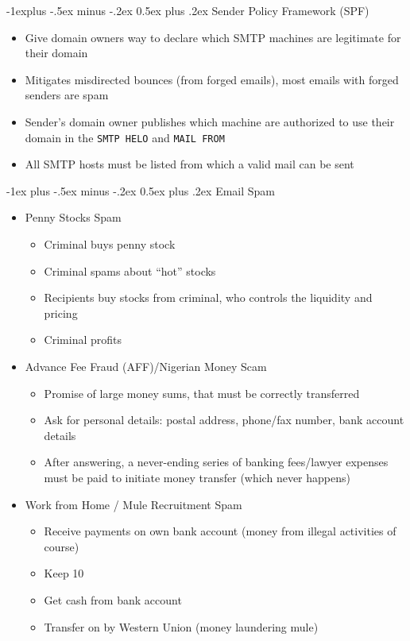 \documentclass[a4paper,twocolumn]{article}
\makeatletter
\newenvironment{itemization}[1][\small]{%
    \begin{itemize}[leftmargin=*]
            #1
        }{%
    \end{itemize}
}
\renewcommand{\section}{%
    \@startsection{section}{1}{0mm}%
    {-1ex plus -.5ex minus -.2ex}%
    {0.5ex plus .2ex}%
    {\normalfont\normalsize\bfseries\sectionrule{12pt}{0.4pt}{0pt}{0pt}}
}
\renewcommand{\subsection}{%
    \@startsection{subsection}{2}{0mm}%
    {-1explus -.5ex minus -.2ex}%
    {0.5ex plus .2ex}%
    {\normalfont\small\bfseries}
}
\makeatother
\begin{document}
\begin{footnotesize}
\subsection{Sender Policy Framework (SPF)}
\begin{itemization}
\item Give domain owners way to declare which SMTP machines are legitimate for their domain
\item Mitigates misdirected bounces (from forged emails), most emails with forged senders are spam
\item Sender's domain owner publishes which machine are authorized to use their domain in the \texttt{SMTP HELO} and \texttt{MAIL FROM}
\item All SMTP hosts must be listed from which a valid mail can be sent
\end{itemization}

\section{Email Spam}
\begin{itemization}
\item Penny Stocks Spam
\begin{itemization}
\item Criminal buys penny stock
\item Criminal spams about ``hot'' stocks
\item Recipients buy stocks from criminal, who controls the liquidity and pricing
\item Criminal profits
\end{itemization}

\item Advance Fee Fraud (AFF)/Nigerian Money Scam
\begin{itemization}
\item Promise of large money sums, that must be correctly transferred
\item Ask for personal details: postal address, phone/fax number, bank account details
\item After answering, a never-ending series of banking fees/lawyer expenses must be paid to initiate money transfer (which never happens)
\end{itemization}

\item Work from Home / Mule Recruitment Spam
\begin{itemization}
\item Receive payments on own bank account (money from illegal activities of course)
\item Keep 10%
\item Get cash from bank account
\item Transfer on by Western Union (money laundering mule)
\end{itemization}


\end{itemization}
\end{footnotesize}
\end{document}

